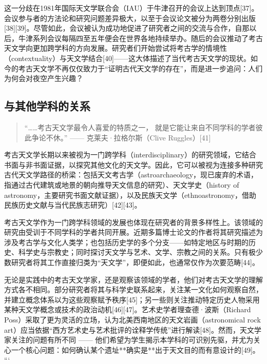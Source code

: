 这一分歧在1981年国际天文学联合会（IAU）于牛津召开的会议上达到顶点[37]。会议参与者的方法论和研究问题差异极大，以至于会议论文被分为两卷分别出版[38][39]。尽管如此，会议被认为成功地促进了研究者之间的交流与合作，自那以后，牛津系列会议每隔四至五年便会在世界各地持续举办。随后的会议推动了考古天文学向更加跨学科的方向发展。研究者们开始尝试将考古学的情境性（contextuality）与天文学结合[40]——这大体描述了当代考古天文学的现状。如今的考古天文学不再仅仅致力于“证明古代天文学的存在”，而是进一步追问：人们为何会对夜空产生兴趣？
\subsection{与其他学科的关系}
\begin{quote}
“……考古天文学最令人喜爱的特质之一，  
就是它能让来自不同学科的学者彼此争论不休。”  
\hfill —— 克莱夫·拉格尔斯（Clive Ruggles）[41]
\end{quote}
考古天文学长期以来被视为一门跨学科（interdisciplinary）的研究领域，它结合书面与非书面证据，以探究其他文化的天文学。因此，它可以被视为连接多种研究古代天文学路径的桥梁：包括天文考古学（astroarchaeology，现已废弃的术语，指通过古代建筑或地景的朝向推导天文信息的研究）、天文学史（history of astronomy，主要研究书面文献证据），以及民族天文学（ethnoastronomy，借助民族历史文献与当代民族志研究）[42][43]。

考古天文学作为一门跨学科领域的发展也体现在研究者的背景多样性上。该领域的研究由受训于不同学科的学者共同开展。近期多篇博士论文的作者将其研究描述为涉及考古学与文化人类学；也包括历史学的多个分支——如特定地区与时期的历史、科学史与宗教史；同时探讨天文学与艺术、文学、宗教之间的关系。只有极少数研究者将其工作直接归类为“天文学”，即便如此，也通常仅作为次要范畴[44]。

无论是实践中的考古天文学家，还是观察该领域的学者，他们对考古天文学的理解方式各不相同。部分研究者将其与科学史联系起来，关注某一文化如何观察自然，并建立概念体系以为这些观察赋予秩序[45]；另一些则关注推动特定历史人物采用某种天文学概念或技术的政治动机[46][47]。艺术史学者理查德·波斯（Richard Poss）采取了更为灵活的立场，认为北美西南地区的天文岩画（astronomical rock art）应当依据“西方艺术史与艺术批评的诠释学传统”进行解读[48]。然而，天文学家关注的问题有所不同 —— 他们希望为学生揭示本学科的可识别先驱，并尤为关心一个核心问题：如何确认某个遗址**确实是**出于天文目的而有意设计的[49]。
```
